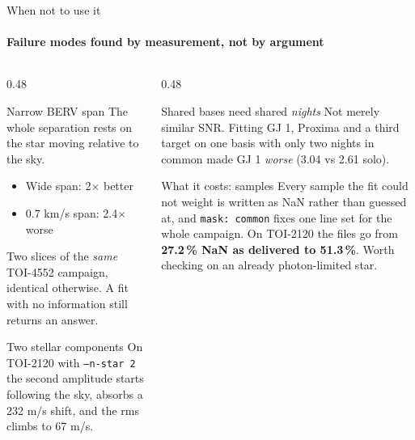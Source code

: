 \documentclass[aspectratio=169,11pt]{beamer}
\begin{document}
\begin{frame}{When not to use it}
  \framesubtitle{Failure modes found by measurement, not by argument}

  \begin{columns}[T]
    \begin{column}{0.48\textwidth}
      \begin{alertblock}{Narrow BERV span}
        The whole separation rests on the star moving relative to the sky.
        \begin{itemize}\small
          \item Wide span: \textcolor{good}{2$\times$ better}
          \item 0.7 km/s span: \textcolor{bad}{2.4$\times$ worse}
        \end{itemize}
        \small Two slices of the \emph{same} TOI-4552 campaign, identical
        otherwise. A fit with no information still returns an answer.
      \end{alertblock}

      \begin{alertblock}{Two stellar components}
        \small
        On TOI-2120 with \texttt{--n-star 2} the second amplitude starts
        following the sky, absorbs a 232 m/s shift, and the rms climbs to
        67 m/s.
      \end{alertblock}
    \end{column}
    \begin{column}{0.48\textwidth}
      \begin{alertblock}{Shared bases need shared \emph{nights}}
        \small
        Not merely similar SNR. Fitting GJ 1, Proxima and a third target on
        one basis with only two nights in common made GJ 1 \emph{worse}
        (3.04 vs 2.61 solo).
      \end{alertblock}

      \begin{block}{What it costs: samples}
        \small
        Every sample the fit could not weight is written as NaN rather than
        guessed at, and \texttt{mask: common} fixes one line set for the whole
        campaign. On TOI-2120 the files go from \textbf{27.2\,\% NaN as
        delivered to 51.3\,\%}. Worth checking on an already photon-limited
        star.
      \end{block}
    \end{column}
  \end{columns}
\end{frame}
\end{document}
